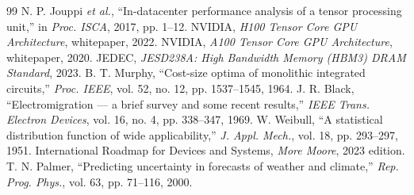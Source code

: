 \begin{thebibliography}{99}
 N. P. Jouppi \emph{et al.}, ``In-datacenter performance analysis of a tensor processing unit,'' in \emph{Proc. ISCA}, 2017, pp. 1--12.
 NVIDIA, \emph{H100 Tensor Core GPU Architecture}, whitepaper, 2022.
 NVIDIA, \emph{A100 Tensor Core GPU Architecture}, whitepaper, 2020.
 JEDEC, \emph{JESD238A: High Bandwidth Memory (HBM3) DRAM Standard}, 2023.
 B. T. Murphy, ``Cost-size optima of monolithic integrated circuits,'' \emph{Proc. IEEE}, vol. 52, no. 12, pp. 1537--1545, 1964.
 J. R. Black, ``Electromigration --- a brief survey and some recent results,'' \emph{IEEE Trans. Electron Devices}, vol. 16, no. 4, pp. 338--347, 1969.
 W. Weibull, ``A statistical distribution function of wide applicability,'' \emph{J. Appl. Mech.}, vol. 18, pp. 293--297, 1951.
 International Roadmap for Devices and Systems, \emph{More Moore}, 2023 edition.
 T. N. Palmer, ``Predicting uncertainty in forecasts of weather and climate,'' \emph{Rep. Prog. Phys.}, vol. 63, pp. 71--116, 2000.
\end{thebibliography}
